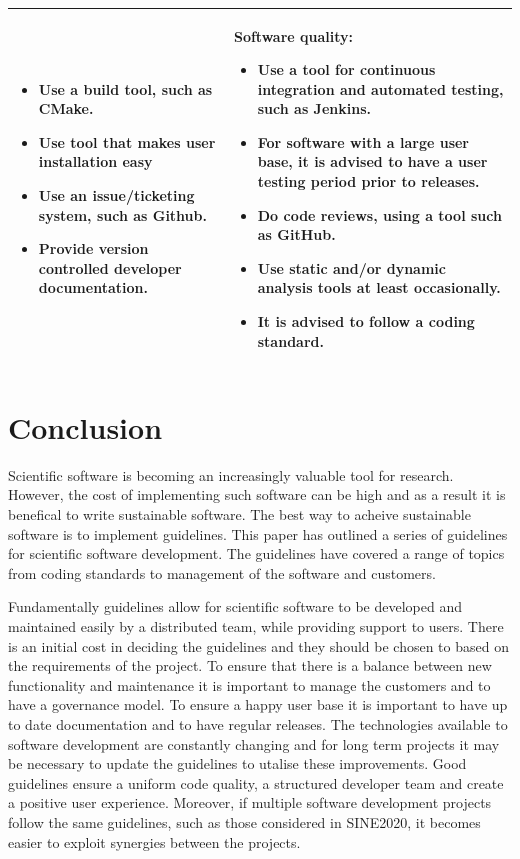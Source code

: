 \documentclass[jnr]{iosart2x}
\begin{document}
\begin{tabular}{l|l}
\begin{minipage}[t]{0.4\textwidth}
\begin{itemize}
      \item Use a build tool, such as CMake.
      \item Use tool that makes user installation easy
      \item Use an issue/ticketing system, such as Github.
      \item Provide version controlled developer documentation.
    \end{itemize}
  \end{minipage} & 
  \begin{minipage}[t]{0.4\textwidth}
    Software quality:
    \begin{itemize}
      \item Use a tool for continuous integration and automated testing, such as Jenkins.
      \item For software with a large user base, it is advised to have a user testing period prior to releases.
      \item Do code reviews, using a tool such as GitHub.
      \item Use static and/or dynamic analysis tools at least occasionally.
      \item It is advised to follow a coding standard.
    \end{itemize}
  \end{minipage}  \\  
 \hline
\end{tabular}

\section{Conclusion}
\label{Conclusion}

Scientific software is becoming an increasingly valuable tool for research.
However, the cost of implementing such software can be high and as a result it is benefical to write sustainable software.
The best way to acheive sustainable software is to implement guidelines.
This paper has outlined a series of guidelines for scientific software development.
The guidelines have covered a range of topics from coding standards to management of the software and customers.

Fundamentally guidelines allow for scientific software to be developed and maintained easily by a distributed team, while providing support to users.
There is an initial cost in deciding the guidelines and they should be chosen to based on the requirements of the project.
To ensure that there is a balance between new functionality and maintenance it is important to manage the customers and to have a governance model.
To ensure a happy user base it is important to have up to date documentation and to have regular releases.
The technologies available to software development are constantly changing and for long term projects it may be necessary to update the guidelines to utalise these improvements.
Good guidelines ensure a uniform code quality, a structured developer team and create a positive user experience. Moreover, if multiple software development projects follow the same guidelines, such as those considered in SINE2020, it becomes easier to exploit synergies between the projects.
\end{document}
